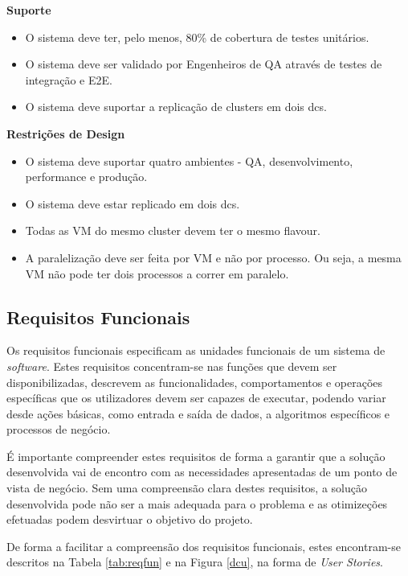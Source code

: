 \textbf{Suporte}
\begin{itemize}
  \item O sistema deve ter, pelo menos, 80\% de cobertura de testes unitários.
  \item O sistema deve ser validado por Engenheiros de \ac{QA} através de testes de integração e \ac{E2E}.
  \item O sistema deve suportar a replicação de \glspl{cluster} em dois \glspl{dc}.
\end{itemize}

\textbf{Restrições de Design}
\begin{itemize}
  \item O sistema deve suportar quatro ambientes - \ac{QA}, desenvolvimento, 
    performance e produção.
  \item O sistema deve estar replicado em dois \glspl{dc}.
  \item Todas as \ac{VM} do mesmo \gls{cluster} devem ter o mesmo \gls{flavour}.
  \item A paralelização deve ser feita por \ac{VM} e não por processo. Ou seja, a mesma \ac{VM} 
    não pode ter dois processos a correr em paralelo.
\end{itemize}

\subsection{Requisitos Funcionais}
\label{sec:3-rf}

Os requisitos funcionais especificam as unidades funcionais de um sistema de \textit{software}.
Estes requisitos concentram-se nas funções que devem ser disponibilizadas, descrevem as
funcionalidades, comportamentos e operações específicas que os utilizadores devem ser capazes de 
executar, podendo variar desde ações básicas, como entrada e saída de dados, a algoritmos 
específicos e processos de negócio.

É importante compreender estes requisitos de forma a garantir que a solução desenvolvida vai de
encontro com as necessidades apresentadas de um ponto de vista de negócio. Sem uma compreensão
clara destes requisitos, a solução desenvolvida pode não ser a mais adequada para o problema
e as otimizeções efetuadas podem desvirtuar o objetivo do projeto.

De forma a facilitar a compreensão dos requisitos funcionais, estes encontram-se descritos na 
Tabela \ref{tab:reqfun} e na Figura \ref{dcu}, na forma de \textit{User Stories}.

